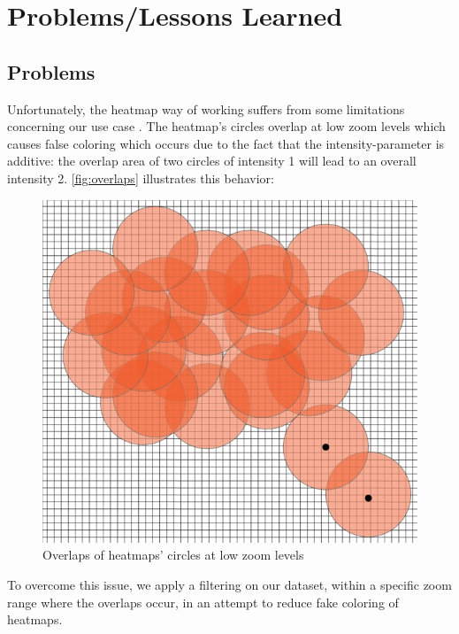 \documentclass[10pt,a4paper]{article} %
\begin{document}
    

    
    

    \section{Problems/Lessons Learned}
	\subsection{Problems}

	Unfortunately, the heatmap way of working suffers from some limitations concerning our use case \cite{limitation}. The heatmap's circles overlap at low zoom levels which causes false coloring which occurs due to the fact that the intensity-parameter is additive: the overlap area of two circles of intensity 1 will lead to an overall intensity 2. \autoref{fig:overlaps} illustrates this behavior:
    
    \begin{figure}[H]
    \centering
	   
       \includegraphics[scale =0.4]{pic6}
    \caption{Overlaps of heatmaps' circles at low zoom levels}
		  \label{fig:overlaps}
       
    \end{figure}
    \noindent
    To overcome this issue, we apply a filtering on our dataset, within a specific zoom range where the overlaps occur, in an attempt to reduce fake coloring of heatmaps.
\end{document}

